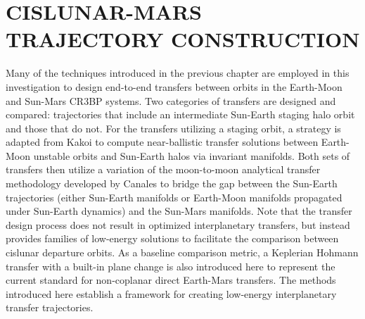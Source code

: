 \chapter{CISLUNAR-MARS TRAJECTORY CONSTRUCTION}

Many of the techniques introduced in the previous chapter are employed in this investigation to
design end-to-end transfers between orbits in the Earth-Moon and Sun-Mars CR3BP systems. Two
categories of transfers are designed and compared: trajectories that include an intermediate
Sun-Earth staging halo orbit and those that do not. For the transfers utilizing a staging orbit, a
strategy is adapted from Kakoi to compute near-ballistic transfer solutions between Earth-Moon
unstable orbits and Sun-Earth halos via invariant manifolds\cite{Kakoi:2015}. Both sets of
transfers then utilize a variation of the moon-to-moon analytical transfer methodology developed by
Canales to bridge the gap between the Sun-Earth trajectories (either Sun-Earth manifolds or
Earth-Moon manifolds propagated under Sun-Earth dynamics) and the Sun-Mars
manifolds\cite{Canales:2021b}. Note that the transfer design process does not result in optimized
interplanetary transfers, but instead provides families of low-energy solutions to facilitate the
comparison between cislunar departure orbits. As a baseline comparison metric, a Keplerian Hohmann
transfer with a built-in plane change is also introduced here to represent the current standard for
non-coplanar direct Earth-Mars transfers. The methods introduced here establish a framework for
creating low-energy interplanetary transfer trajectories.





